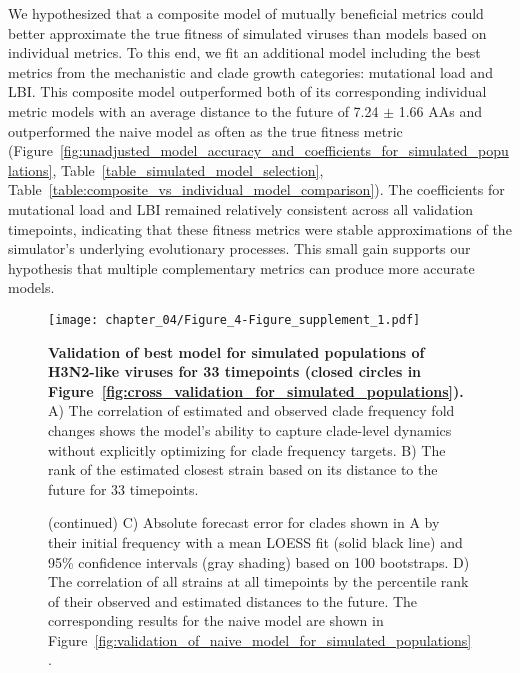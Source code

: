 We hypothesized that a composite model of mutually beneficial metrics could better approximate the true fitness of simulated viruses than models based on individual metrics.
To this end, we fit an additional model including the best metrics from the mechanistic and clade growth categories: mutational load and LBI.
This composite model outperformed both of its corresponding individual metric models with an average distance to the future of 7.24 $\pm$ 1.66 AAs and outperformed the naive model as often as the true fitness metric (Figure~\ref{fig:unadjusted_model_accuracy_and_coefficients_for_simulated_populations}, Table~\ref{table_simulated_model_selection}, Table~\ref{table:composite_vs_individual_model_comparison}).
The coefficients for mutational load and LBI remained relatively consistent across all validation timepoints, indicating that these fitness metrics were stable approximations of the simulator's underlying evolutionary processes.
This small gain supports our hypothesis that multiple complementary metrics can produce more accurate models.

\begin{figure}
  \texttt{[image: chapter\_04/Figure\_4-Figure\_supplement\_1.pdf]}
  \caption[{Validation of best model for simulated populations of H3N2-like viruses for 33 timepoints (closed circles in Figure~\ref{fig:cross_validation_for_simulated_populations}).}]{
    {\bf Validation of best model for simulated populations of H3N2-like viruses for 33 timepoints (closed circles in Figure~\ref{fig:cross_validation_for_simulated_populations}).}
    A) The correlation of estimated and observed clade frequency fold changes shows the model's ability to capture clade-level dynamics without explicitly optimizing for clade frequency targets.
    B) The rank of the estimated closest strain based on its distance to the future for 33 timepoints.
  }
  \label{fig:validation_of_best_model_for_simulated_populations}
\end{figure}

\begin{figure}\ContinuedFloat
  \caption[{}]{(continued)
    C) Absolute forecast error for clades shown in A by their initial frequency with a mean LOESS fit (solid black line) and 95\% confidence intervals (gray shading) based on 100 bootstraps.
    D) The correlation of all strains at all timepoints by the percentile rank of their observed and estimated distances to the future.
    The corresponding results for the naive model are shown in Figure~\ref{fig:validation_of_naive_model_for_simulated_populations}.
  }
\end{figure}

